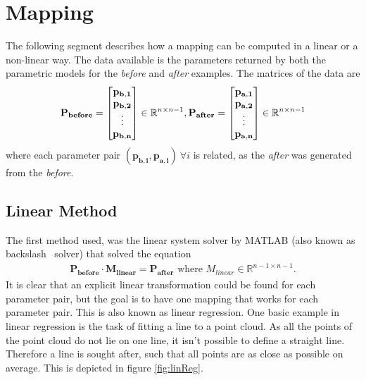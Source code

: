 \section{Mapping}
The following segment describes how a mapping can be computed in a linear or a non-linear way. The data available is the parameters returned by both the parametric models for the \textit{before} and \textit{after} examples. The matrices of the data are
\begin{gather}
  \mathbf{P_{before}} =
  \begin{bmatrix}
    \mathbf{p_{b,1}} \\
    \mathbf{p_{b,2}}  \\
    \vdots \\
    \mathbf{p_{b,n}}
  \end{bmatrix}
  \in \mathbb{R}^{n \times n-1},
  \mathbf{P_{after}} =
  \begin{bmatrix}
    \mathbf{p_{a,1}} \\
    \mathbf{p_{a,2}} \\
    \vdots \\
    \mathbf{p_{a,n}}
  \end{bmatrix}
  \in \mathbb{R}^{n \times n-1}
\end{gather}
where each parameter pair $(\mathbf{p_{b,i}}, \mathbf{p_{a,i}})\ \forall i$ is related, as the \textit{after} was generated from the \textit{before}.

\subsection{Linear Method}
The first method used, was the linear system solver by MATLAB (also known as backslash \ solver) that solved the equation
\begin{gather}
  \mathbf{P_{before}} \cdot \mathbf{M_{linear}} = \mathbf{P_{after}}
  \text{ where } M_{linear} \in \mathbb{R}^{n-1 \times n-1}.
\end{gather}
It is clear that an explicit linear transformation could be found for each parameter pair, but the goal is to have one mapping that works for each parameter pair. This is also known as linear regression. One basic example in linear regression is the task of fitting a line to a point cloud. As all the points of the point cloud do not lie on one line, it isn't possible to define a straight line. Therefore a line is sought after, such that all points are as close as possible on average. This is depicted in figure \ref{fig:linReg}.

